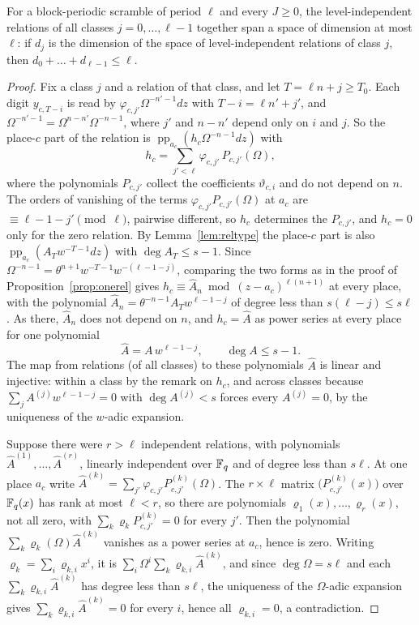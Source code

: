 \begin{proposition}\label{prop:blockrel}
For a block-periodic scramble of period $\ell$ and every $J\ge0$, the level-independent relations of all classes $j=0,\dots,\ell-1$ together span a space of dimension at most $\ell$: if $d_j$ is the dimension of the space of level-independent relations of class $j$, then $d_0+\dots+d_{\ell-1}\le\ell$.
\end{proposition}

\begin{proof}
Fix a class $j$ and a relation of that class, and let $T=\ell n+j\ge T_0$. Each digit $y_{c,T-i}$ is read by $\varphi_{c,j'}\Omega^{-n'-1}dz$ with $T-i=\ell n'+j'$, and $\Omega^{-n'-1}=\Omega^{n-n'}\Omega^{-n-1}$, where $j'$ and $n-n'$ depend only on $i$ and $j$. So the place-$c$ part of the relation is $\operatorname{pp}_{a_c}(h_c\Omega^{-n-1}dz)$ with
\[
h_c=\sum_{j'<\ell}\varphi_{c,j'}\,P_{c,j'}(\Omega),
\]
where the polynomials $P_{c,j'}$ collect the coefficients $\vartheta_{c,i}$ and do not depend on $n$. The orders of vanishing of the terms $\varphi_{c,j'}P_{c,j'}(\Omega)$ at $a_c$ are $\equiv\ell-1-j'\pmod\ell$, pairwise different, so $h_c$ determines the $P_{c,j'}$, and $h_c=0$ only for the zero relation. By Lemma~\ref{lem:reltype} the place-$c$ part is also $\operatorname{pp}_{a_c}(A_Tw^{-T-1}dz)$ with $\deg A_T\le s-1$. Since $\Omega^{-n-1}=\theta^{n+1}w^{-T-1}w^{-(\ell-1-j)}$, comparing the two forms as in the proof of Proposition~\ref{prop:onerel} gives $h_c\equiv\hat A_n\bmod(z-a_c)^{\ell(n+1)}$ at every place, with the polynomial $\hat A_n=\theta^{-n-1}A_Tw^{\ell-1-j}$ of degree less than $s(\ell-j)\le s\ell$. As there, $\hat A_n$ does not depend on $n$, and $h_c=\hat A$ as power series at every place for one polynomial
\[
\hat A=A\,w^{\ell-1-j},\qquad \deg A\le s-1 .
\]
The map from relations (of all classes) to these polynomials $\hat A$ is linear and injective: within a class by the remark on $h_c$, and across classes because $\sum_jA^{(j)}w^{\ell-1-j}=0$ with $\deg A^{(j)}<s$ forces every $A^{(j)}=0$, by the uniqueness of the $w$-adic expansion.

Suppose there were $r>\ell$ independent relations, with polynomials $\hat A^{(1)},\dots,\hat A^{(r)}$, linearly independent over $\mathbb{F}_q$ and of degree less than $s\ell$. At one place $a_c$ write $\hat A^{(k)}=\sum_{j'}\varphi_{c,j'}P^{(k)}_{c,j'}(\Omega)$. The $r\times\ell$ matrix $\bigl(P^{(k)}_{c,j'}(x)\bigr)$ over $\mathbb{F}_q(x)$ has rank at most $\ell<r$, so there are polynomials $\varrho_1(x),\dots,\varrho_r(x)$, not all zero, with $\sum_k\varrho_kP^{(k)}_{c,j'}=0$ for every $j'$. Then the polynomial $\sum_k\varrho_k(\Omega)\hat A^{(k)}$ vanishes as a power series at $a_c$, hence is zero. Writing $\varrho_k=\sum_i\varrho_{k,i}x^i$, it is $\sum_i\Omega^i\sum_k\varrho_{k,i}\hat A^{(k)}$, and since $\deg\Omega=s\ell$ and each $\sum_k\varrho_{k,i}\hat A^{(k)}$ has degree less than $s\ell$, the uniqueness of the $\Omega$-adic expansion gives $\sum_k\varrho_{k,i}\hat A^{(k)}=0$ for every $i$, hence all $\varrho_{k,i}=0$, a contradiction.
\end{proof}

